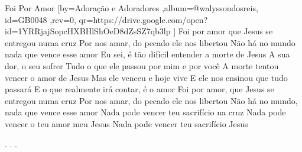 \beginsong
{Foi Por Amor %
}[by={Adoração e Adoradores %
},album={@walyssondosreis},
id={GB0048 %
},rev={0}, %
qr={https://drive.google.com/open?id=1YRRjajSopcHXBHlShOeD8dZsSZ7qb3lp %
}]
\beginverse*
Foi por amor que Jesus se entregou numa cruz
Por nos amar, do pecado ele nos libertou
Não há no mundo nada que vence esse amor
\endverse
\beginverse*
Eu sei, é tão difícil entender a morte de Jesus
A sua dor, o seu sofrer
Tudo o que ele passou por mim e por você
\endverse
\beginverse*
A morte tentou vencer o amor de Jesus
Mas ele venceu e hoje vive
E ele nos ensinou que tudo passará
E o que realmente irá contar, é o amor
\endverse
\beginchorus
Foi por amor, que Jesus se entregou numa cruz
Por nos amar, do pecado ele nos libertou
Não há no mundo, nada que vence esse amor
\endchorus
\beginverse*
Nada pode vencer teu sacrifício na cruz
Nada pode vencer o teu amor meu Jesus
Nada pode vencer teu sacrifício Jesus
\endverse


\beginverse*\color{white}
.
.
.
\endverse
\begin{comment}
\lstset{basicstyle=\scriptsize\bf} %
\tab{Solo 1}
\begin{lstlisting}
E|-----------------------------------------------------|
B|-----------------------------------------------------|
G|-----------------------------------------------------|
D|-----------------------------------------------------|
A|-----------------------------------------------------|
E|-----------------------------------------------------|
\end{lstlisting}
\end{comment}
 
